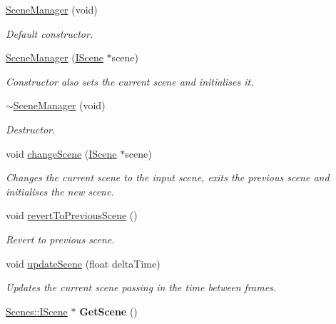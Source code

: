 \begin{DoxyCompactItemize}
\item 
\hypertarget{class_scenes_1_1_scene_manager_a430af5cbeec7a547224ae15a2d21ac89}{\hyperlink{class_scenes_1_1_scene_manager_a430af5cbeec7a547224ae15a2d21ac89}{Scene\-Manager} (void)}\label{class_scenes_1_1_scene_manager_a430af5cbeec7a547224ae15a2d21ac89}

\begin{DoxyCompactList}\small\item\em Default constructor. \end{DoxyCompactList}\item 
\hyperlink{class_scenes_1_1_scene_manager_a003add21b26892729975432b99601af0}{Scene\-Manager} (\hyperlink{class_scenes_1_1_i_scene}{I\-Scene} $\ast$scene)
\begin{DoxyCompactList}\small\item\em Constructor also sets the current scene and initialises it. \end{DoxyCompactList}\item 
\hypertarget{class_scenes_1_1_scene_manager_a710c032c05756e4abe360d6384a4d658}{\hyperlink{class_scenes_1_1_scene_manager_a710c032c05756e4abe360d6384a4d658}{$\sim$\-Scene\-Manager} (void)}\label{class_scenes_1_1_scene_manager_a710c032c05756e4abe360d6384a4d658}

\begin{DoxyCompactList}\small\item\em Destructor. \end{DoxyCompactList}\item 
void \hyperlink{class_scenes_1_1_scene_manager_aaadb1378ac23b3c26c44e6f20626c704}{change\-Scene} (\hyperlink{class_scenes_1_1_i_scene}{I\-Scene} $\ast$scene)
\begin{DoxyCompactList}\small\item\em Changes the current scene to the input scene, exits the previous scene and initialises the new scene. \end{DoxyCompactList}\item 
\hypertarget{class_scenes_1_1_scene_manager_a3e488084d46e3e0805d3fd2852a0cac7}{void \hyperlink{class_scenes_1_1_scene_manager_a3e488084d46e3e0805d3fd2852a0cac7}{revert\-To\-Previous\-Scene} ()}\label{class_scenes_1_1_scene_manager_a3e488084d46e3e0805d3fd2852a0cac7}

\begin{DoxyCompactList}\small\item\em Revert to previous scene. \end{DoxyCompactList}\item 
void \hyperlink{class_scenes_1_1_scene_manager_af9eafb95ed2b49fa867c5b9b45416382}{update\-Scene} (float delta\-Time)
\begin{DoxyCompactList}\small\item\em Updates the current scene passing in the time between frames. \end{DoxyCompactList}\item 
\hypertarget{class_scenes_1_1_scene_manager_a19458b9c99068f3607fb58368f650c2b}{\hyperlink{class_scenes_1_1_i_scene}{Scenes\-::\-I\-Scene} $\ast$ {\bfseries Get\-Scene} ()}\label{class_scenes_1_1_scene_manager_a19458b9c99068f3607fb58368f650c2b}


\end{DoxyCompactItemize}
